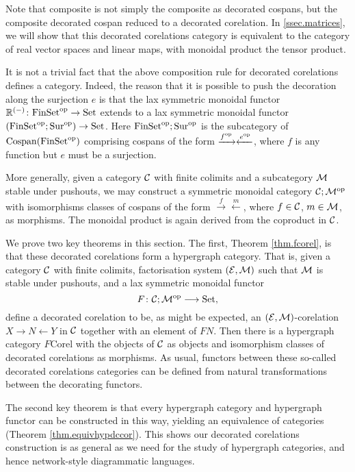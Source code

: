 Note that composite is not simply the composite as decorated cospans, but the
composite decorated cospan reduced to a decorated corelation. In
\textsection\ref{ssec.matrices}, we will show that this decorated corelations
category is equivalent to the category of real vector spaces and linear maps,
with monoidal product the tensor product.

It is not a trivial fact that the above composition rule for decorated
corelations defines a category. Indeed, the reason that it is possible to push
the decoration along the surjection $e$ is that the lax symmetric monoidal
functor ${\mathbb{R}}^{(-)}{\colon} \mathrm{FinSet}^{\mathrm{op}} \to \mathrm{Set}$ extends to a lax symmetric
monoidal functor $(\mathrm{FinSet}^{\mathrm{op}};\mathrm{Sur}^{\mathrm{op}}) \to \mathrm{Set}$. Here
$\mathrm{FinSet}^{\mathrm{op}};\mathrm{Sur}^{\mathrm{op}}$ is the subcategory of $\operatorname{{Cospan}}(\mathrm{FinSet}^{\mathrm{op}})$
comprising cospans of the form $\xrightarrow{f^{\mathrm{op}}}\xleftarrow{e^{\mathrm{op}}}$, where
$f$ is any function but $e$ must be a surjection.

More generally, given a category $\mathcal C$ with finite colimits and a subcategory
$\mathcal M$ stable under pushouts, we may construct a symmetric monoidal category
$\mathcal C;\mathcal M^{\mathrm{op}}$ with isomorphisms classes of cospans of the form
$\xrightarrow{f}\xleftarrow{m}$, where $f \in \mathcal C$, $m \in \mathcal M$, as
morphisms. The monoidal product is again derived from the coproduct in $\mathcal C$.

We prove two key theorems in this section. The first, Theorem \ref{thm.fcorel},
is that these decorated corelations form a hypergraph category. That is, given a
category $\mathcal C$ with finite colimits, factorisation system $(\mathcal E,\mathcal M)$ such
that $\mathcal M$ is stable under pushouts, and a lax symmetric monoidal functor 
\[
  F{\colon} \mathcal C; \mathcal M^{\mathrm{op}} \longrightarrow \mathrm{Set},
\]
define a decorated corelation to be, as might be expected, an $(\mathcal E,\mathcal
M)$-corelation $X \to N \leftarrow Y$ in $\mathcal C$ together with an element of
$FN$. Then there is a hypergraph category $F\mathrm{Corel}$ with the objects of
$\mathcal C$ as objects and isomorphism classes of decorated corelations as
morphisms. As usual, functors between these so-called decorated corelations
categories can be defined from natural transformations between the decorating
functors.

The second key theorem is that every hypergraph category and hypergraph
functor can be constructed in this way, yielding an equivalence of categories
(Theorem \ref{thm.equivhypdccor}). This shows our decorated corelations
construction is as general as we need for the study of hypergraph categories,
and hence network-style diagrammatic languages.


